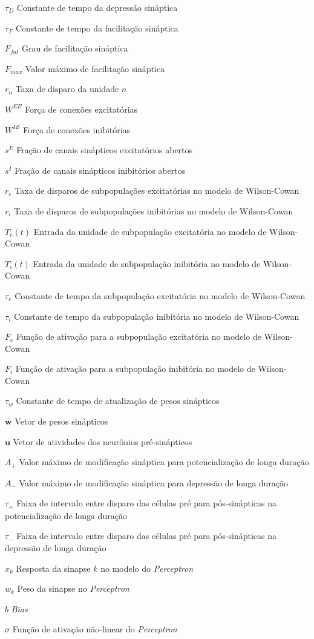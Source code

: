 \documentclass[
	12pt,				%
	openright,			%
	oneside,			%
	a4paper,			%
	chapter=TITLE,		%
	english,			%
	french,				%
	spanish,			%
	brazil				%
	]{abntex2}
\theoremstyle{definition}
\begin{document}
\begin{simbolos}
\item[$\tau_D$] Constante de tempo da depressão sináptica
\item[$\tau_F$] Constante de tempo da facilitação sináptica
\item[$F_{fat}$] Grau de facilitação sináptica
\item[$F_{max}$] Valor máximo de facilitação sináptica
\item[$r_n$] Taxa de disparo da unidade $n$
\item[$W^{EE}$] Força de conexões excitatórias
\item[$W^{IE}$] Força de conexões inibitórias
\item[$s^E$] Fração de canais sinápticos excitatórios abertos
\item[$s^I$] Fração de canais sinápticos inibitórios abertos
\item[$r_e$] Taxa de disparos de subpopulações excitatórias no modelo de Wilson-Cowan
\item[$r_i$] Taxa de disparos de subpopulações inibitórias no modelo de Wilson-Cowan
\item[$T_e(t)$] Entrada da unidade de subpopulação excitatória no modelo de Wilson-Cowan
\item[$T_i(t)$] Entrada da unidade de subpopulação inibitória no modelo de Wilson-Cowan
\item[$\tau_e$] Constante de tempo da subpopulação excitatória no modelo de Wilson-Cowan
\item[$\tau_i$] Constante de tempo da subpopulação inibitória no modelo de Wilson-Cowan
\item[$F_e$] Função de ativação para a subpopulação excitatória no modelo de Wilson-Cowan
\item[$F_i$] Função de ativação para a subpopulação inibitória no modelo de Wilson-Cowan
\item[$\tau_w$] Constante de tempo de atualização de pesos sinápticos
\item[$\mathbf{w}$] Vetor de pesos sinápticos
\item[$\mathbf{u}$] Vetor de atividades dos neurônios pré-sinápticos
\item[$A_+$] Valor máximo de modificação sináptica para potencialização de longa duração
\item[$A_-$] Valor máximo de modificação sináptica para depressão de longa duração
\item[$\tau_+$] Faixa de intervalo entre disparo das células pré para pós-sinápticas na potencialização de longa duração
\item[$\tau_-$] Faixa de intervalo entre disparo das células pré para pós-sinápticas na depressão de longa duração
\item[$x_k$] Resposta da sinapse $k$ no modelo do \textit{Perceptron}
\item[$w_k$] Peso da sinapse no \textit{Perceptron}
\item[$b$] \textit{Bias}
\item[$\sigma$] Função de ativação não-linear do \textit{Perceptron}
\end{simbolos}
\end{document}
